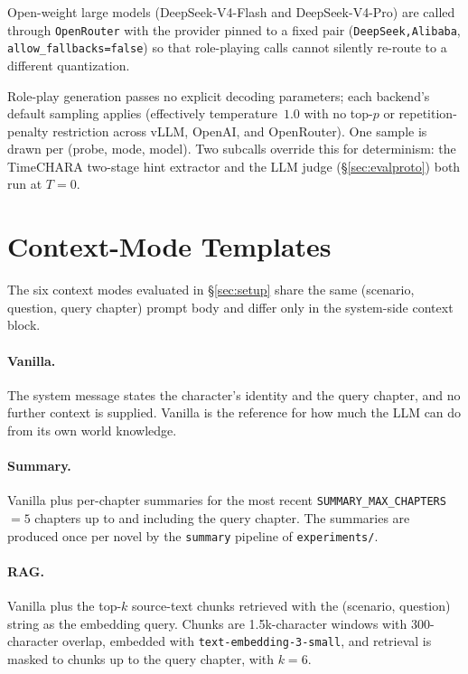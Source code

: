 \documentclass[11pt]{article}
\begin{document}
Open-weight large models (DeepSeek-V4-Flash and DeepSeek-V4-Pro) are called through \texttt{OpenRouter} with the provider pinned to a fixed pair (\texttt{DeepSeek,Alibaba}, \texttt{allow\_fallbacks=false}) so that role-playing calls cannot silently re-route to a different quantization. 

Role-play generation passes no explicit decoding parameters; each backend's default sampling applies (effectively temperature~$1.0$ with no top-$p$ or repetition-penalty restriction across vLLM, OpenAI, and OpenRouter). One sample is drawn per (probe, mode, model). Two subcalls override this for determinism: the TimeCHARA two-stage hint extractor and the LLM judge (\S\ref{sec:evalproto}) both run at $T=0$.






\section{Context-Mode Templates\label{app:contextmodes}}

The six context modes evaluated in \S\ref{sec:setup} share the same (scenario, question, query chapter) prompt body and differ only in the system-side context block.

\paragraph{Vanilla.}
The system message states the character's identity and the query chapter, and no further context is supplied. Vanilla is the reference for how much the LLM can do from its own world knowledge.

\paragraph{Summary.}
Vanilla plus per-chapter summaries for the most recent \texttt{SUMMARY\_MAX\_CHAPTERS}~$=5$ chapters up to and including the query chapter. The summaries are produced once per novel by the \texttt{summary} pipeline of \texttt{experiments/}.

\paragraph{RAG.}
Vanilla plus the top-$k$ source-text chunks retrieved with the (scenario, question) string as the embedding query. Chunks are 1.5k-character windows with 300-character overlap, embedded with \texttt{text-embedding-3-small}, and retrieval is masked to chunks up to the query chapter, with $k=6$.
\end{document}
